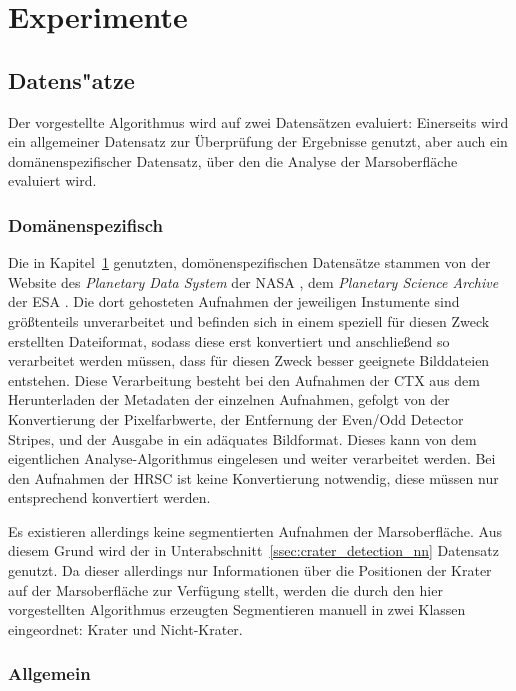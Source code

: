 \chapter{Experimente}
\label{chap:experiments}

\section{Datens"atze}
\label{sec:datasets}

Der vorgestellte Algorithmus wird auf zwei Datensätzen evaluiert: Einerseits wird ein allgemeiner Datensatz zur Überprüfung der Ergebnisse genutzt, aber auch ein domänenspezifischer Datensatz, über den die Analyse der Marsoberfläche evaluiert wird. 

\subsection{Domänenspezifisch}

Die in Kapitel~\ref{chap:experiments} genutzten, domönenspezifischen Datensätze stammen von der Website des \textit{Planetary Data System} der NASA \cite{pds}, \bzw dem \textit{Planetary Science Archive} der ESA \cite{psa}. Die dort gehosteten Aufnahmen der jeweiligen Instumente sind größtenteils unverarbeitet und befinden sich in einem speziell für diesen Zweck erstellten Dateiformat, sodass diese erst konvertiert und anschließend so verarbeitet werden müssen, dass für diesen Zweck besser geeignete Bilddateien entstehen.
Diese Verarbeitung besteht bei den Aufnahmen der CTX aus dem Herunterladen der Metadaten der einzelnen Aufnahmen, gefolgt von der Konvertierung der Pixelfarbwerte, der Entfernung der Even/Odd Detector Stripes, und der Ausgabe in ein adäquates Bildformat. Dieses kann von dem eigentlichen Analyse-Algorithmus eingelesen und weiter verarbeitet werden. Bei den Aufnahmen der HRSC ist keine Konvertierung notwendig, diese müssen nur entsprechend konvertiert werden.

Es existieren allerdings keine segmentierten Aufnahmen der Marsoberfläche. Aus diesem Grund wird der in Unterabschnitt~\ref{ssec:crater_detection_nn} Datensatz genutzt. Da dieser allerdings nur Informationen über die Positionen der Krater auf der Marsoberfläche zur Verfügung stellt, werden die durch den hier vorgestellten Algorithmus erzeugten Segmentieren manuell in zwei Klassen eingeordnet: Krater und Nicht-Krater.

\subsection{Allgemein}

